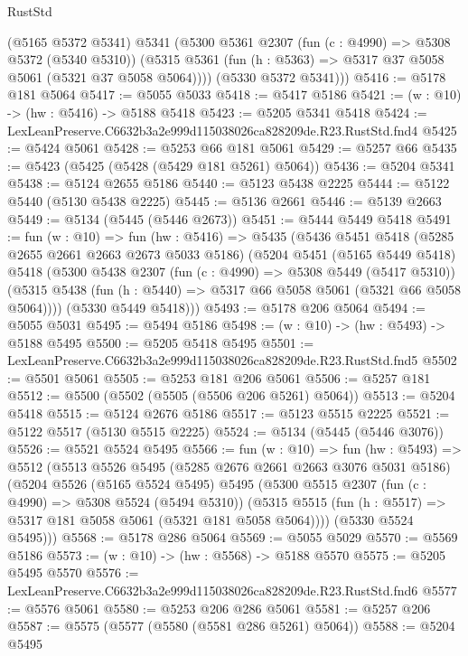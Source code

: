 \begin{lexlean}{RustStd}
\begin{coremodule}
        (@5165 @5372 @5341)
        @5341
        (@5300
          @5361
          @2307
          (fun (c : @4990) => @5308 @5372 (@5340 @5310))
          (@5315 @5361 (fun (h : @5363) => @5317 @37 @5058 @5061 (@5321 @37 @5058 @5064))))
        (@5330 @5372 @5341)))
@5416 := @5178 @181 @5064
@5417 := @5055 @5033
@5418 := @5417 @5186
@5421 := (w : @10) -> (hw : @5416) -> @5188 @5418
@5423 := @5205 @5341 @5418
@5424 := LexLeanPreserve.C6632b3a2e999d115038026ca828209de.R23.RustStd.fnd4
@5425 := @5424 @5061
@5428 := @5253 @66 @181 @5061
@5429 := @5257 @66
@5435 := @5423 (@5425 (@5428 (@5429 @181 @5261) @5064))
@5436 := @5204 @5341
@5438 := @5124 @2655 @5186
@5440 := @5123 @5438 @2225
@5444 := @5122 @5440 (@5130 @5438 @2225)
@5445 := @5136 @2661
@5446 := @5139 @2663
@5449 := @5134 (@5445 (@5446 @2673))
@5451 := @5444 @5449 @5418
@5491 := fun (w : @10) =>
  fun (hw : @5416) =>
  @5435
    (@5436
      @5451
      @5418
      (@5285 @2655 @2661 @2663 @2673 @5033 @5186)
      (@5204
        @5451
        (@5165 @5449 @5418)
        @5418
        (@5300
          @5438
          @2307
          (fun (c : @4990) => @5308 @5449 (@5417 @5310))
          (@5315 @5438 (fun (h : @5440) => @5317 @66 @5058 @5061 (@5321 @66 @5058 @5064))))
        (@5330 @5449 @5418)))
@5493 := @5178 @206 @5064
@5494 := @5055 @5031
@5495 := @5494 @5186
@5498 := (w : @10) -> (hw : @5493) -> @5188 @5495
@5500 := @5205 @5418 @5495
@5501 := LexLeanPreserve.C6632b3a2e999d115038026ca828209de.R23.RustStd.fnd5
@5502 := @5501 @5061
@5505 := @5253 @181 @206 @5061
@5506 := @5257 @181
@5512 := @5500 (@5502 (@5505 (@5506 @206 @5261) @5064))
@5513 := @5204 @5418
@5515 := @5124 @2676 @5186
@5517 := @5123 @5515 @2225
@5521 := @5122 @5517 (@5130 @5515 @2225)
@5524 := @5134 (@5445 (@5446 @3076))
@5526 := @5521 @5524 @5495
@5566 := fun (w : @10) =>
  fun (hw : @5493) =>
  @5512
    (@5513
      @5526
      @5495
      (@5285 @2676 @2661 @2663 @3076 @5031 @5186)
      (@5204
        @5526
        (@5165 @5524 @5495)
        @5495
        (@5300
          @5515
          @2307
          (fun (c : @4990) => @5308 @5524 (@5494 @5310))
          (@5315 @5515 (fun (h : @5517) => @5317 @181 @5058 @5061 (@5321 @181 @5058 @5064))))
        (@5330 @5524 @5495)))
@5568 := @5178 @286 @5064
@5569 := @5055 @5029
@5570 := @5569 @5186
@5573 := (w : @10) -> (hw : @5568) -> @5188 @5570
@5575 := @5205 @5495 @5570
@5576 := LexLeanPreserve.C6632b3a2e999d115038026ca828209de.R23.RustStd.fnd6
@5577 := @5576 @5061
@5580 := @5253 @206 @286 @5061
@5581 := @5257 @206
@5587 := @5575 (@5577 (@5580 (@5581 @286 @5261) @5064))
@5588 := @5204 @5495

\end{coremodule}
\end{lexlean}
